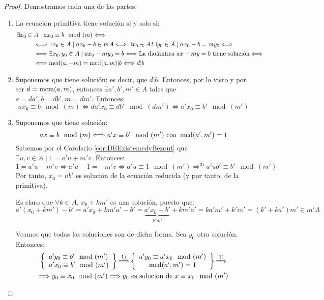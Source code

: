 \begin{proof} Demostramos cada una de las partes:
\begin{enumerate}
    \item La ecuación primitiva tiene solución si y solo si:
    \begin{align*}
        & \exists x_0 \in A \mid ax_0 \equiv b\mod(m) \Longleftrightarrow \\
        &\hspace{1cm} \Longleftrightarrow \exists x_0 \in A \mid ax_0 -b\in mA \Longleftrightarrow \exists x_0 \in A 2 \exists y_0 \in A \mid ax_0 -b = my_0 \Longleftrightarrow \\
        &\hspace{1cm} \Longleftrightarrow \exists x_0, y_0 \in A \mid ax_0 - my_0 = b \Longleftrightarrow \text{La diofántica } ax-my=b \text{ tiene solución} \Longleftrightarrow \\
        &\hspace{1cm} \Longleftrightarrow \operatorname{mcd}(a,-m) = \operatorname{mcd}(a,m)|b \Longleftrightarrow d|b
    \end{align*}

    \item Suponemos que tiene solución; es decir, que $d|b$. Entonces, por lo visto y por ser $d=\operatorname{mcm}(a,m)$, entonces $\exists a',b',m' \in A$ tales que $a=da', b=db', m=dm'$. Entonces:
    $$ax_0 \equiv b\mod(m) \Longleftrightarrow da'x_0 \equiv db'\mod(dm') \Longleftrightarrow a'x_0 \equiv b'\mod(m')$$

    \item Suponemos que tiene solución:
    $$ax\equiv b\mod(m) \Longleftrightarrow a'x\equiv b'\mod(m') \mbox{ con } \operatorname{mcd}(a',m')=1$$
    Sabemos por el Corolario \ref{cor:DEExistemcdyBezout} que $\exists u,v \in A \mid 1=a'u+m'v $. Entonces:
    $$1=a'u+m'v \Longleftrightarrow a'u-1=-m'v \Longleftrightarrow a'u\equiv 1\mod(m') \mathop{\Longrightarrow}^{3)}
        a'ub' \equiv b'\mod(m')$$
    Por tanto, $x_0 = ub'$ es solución de la ecuación reducida (y por tanto, de la primitiva).

    
    Es claro que $\forall k \in A$, $x_0+km'$ es una solución, puesto que:
    $$a'(x_0+km')-b' = a'x_0 + km'a' -b' = \underbrace{a'x_0-b'}_{k'm'}+km'a' = ka'm'+k'm' = (k'+ka')m'\in m'A$$

    Veamos que todas las soluciones son de dicha forma. Sea $y_0$ otra solución. Entonces:
    \begin{multline*}
        \left\{ \begin{array}{l}
            a'y_0 \equiv b'\mod(m') \\
            a'x_0 \equiv b'\mod(m')
        \end{array} \right\} \mathop{\Longrightarrow}^{1)} \left\{ \begin{array}{c}
            a'y_0 \equiv a'x_0 \mod(m') \\
            \operatorname{mcd}(a',m')=1
        \end{array} \right\} \mathop{\Longrightarrow}^{1)} \\
        \Longrightarrow y_0\equiv x_0\mod(m') \Longrightarrow y_0 \mbox{ es solucion de } x\equiv x_0\mod(m')
    \end{multline*}


\end{enumerate}
\end{proof}
